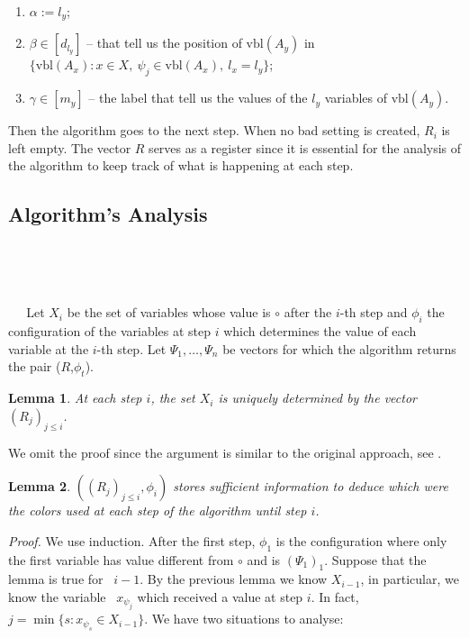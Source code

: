 \documentclass[11pt]{amsart}
\numberwithin{equation}{section}
\newtheorem{lemma}              {Lemma}
\begin{document}
\begin{enumerate}

\item $\alpha := l_y$;

\item $\beta \in [d_{l_y}]$ -- that tell us the position of $\text{vbl}(A_y)$ in $\{ \text{vbl}(A_x) : x \in X, \ \psi_j \in \text{vbl}(A_x), \ l_x = l_y \}$;

\item $\gamma \in [m_y]$ -- the label that tell us the values of  the $l_y$ variables of $\text{vbl}(A_y)$.

\end{enumerate}

\medskip

 Then the algorithm goes to the next step. When no bad setting is created, $R_i$ is left empty. The vector $R$ serves as a register since it is essential for the analysis of the algorithm to keep track of what is happening at each step.
 

\subsection{Algorithm's Analysis}

\

\

$\quad \ \ $Let $X_i$ be the set of variables whose value is $\circ$ after the $i$-th step and $\phi_i$ the configuration of the variables at step $i$ which determines the value of each variable at the $i$-th step. Let $\Psi_1, \ldots, \Psi_n$ be vectors for which the algorithm returns the pair ($R$,$\phi_t$). 



\begin{lemma} At each step $i$, the set $X_i$ is uniquely determined by the vector $(R_j)_{j\leq i}$.
\end{lemma}



We omit the proof since the argument is similar to the original approach, see \cite{Aldo, Entropy Compression}.



\begin{lemma} $((R_j)_{j\leq i},\phi_i)$ stores sufficient information to deduce which were the colors used at each step of the algorithm until step $i$. 
\end{lemma}



\textit{Proof.} We use induction. After the first step, $\phi_1$ is the configuration where only the first variable has value different from $\circ$ and is $(\Psi_1)_1$. Suppose that the lemma is true for~ $i - 1$. By the previous lemma we know $X_{i-1}$, in particular, we know the variable~ $x_{\psi_j}$ which received a value at step $i$. In fact, $j= \min \{ s : x_{\psi_s} \in X_{i-1} \}$. We have two situations to analyse: 
\end{document}

